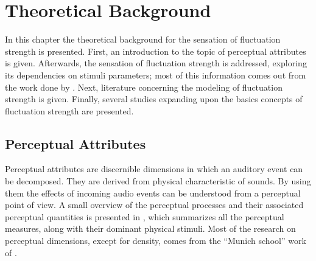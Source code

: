 \documentclass[../main.tex]{subfiles}
\begin{document}
\chapter{Theoretical Background}

In this chapter the theoretical background for the sensation of fluctuation
strength is presented. First, an introduction to the topic of perceptual
attributes is given. Afterwards, the sensation of fluctuation strength is
addressed, exploring its dependencies on stimuli parameters; most of this
information comes out from the work done by \textcite{Fastl2007Psychoacoustics}.
Next, literature concerning the modeling of fluctuation strength is given.
Finally, several studies expanding upon the basics concepts of fluctuation
strength  are presented.

\begin{theoreticalbackground}

\section{Perceptual Attributes}

Perceptual attributes are discernible dimensions in which an auditory event can
be decomposed. They are derived from physical characteristic of sounds. By using
them the effects of incoming audio events can be understood from a perceptual
point of view. A small overview of the perceptual processes and their associated
perceptual quantities is presented in , which summarizes all
the perceptual measures, along with their dominant physical stimuli. Most of the
research on perceptual dimensions, except for density, comes from the
``Munich school'' work of \textcite{Fastl2007Psychoacoustics}.


\end{theoreticalbackground}
\end{document}
